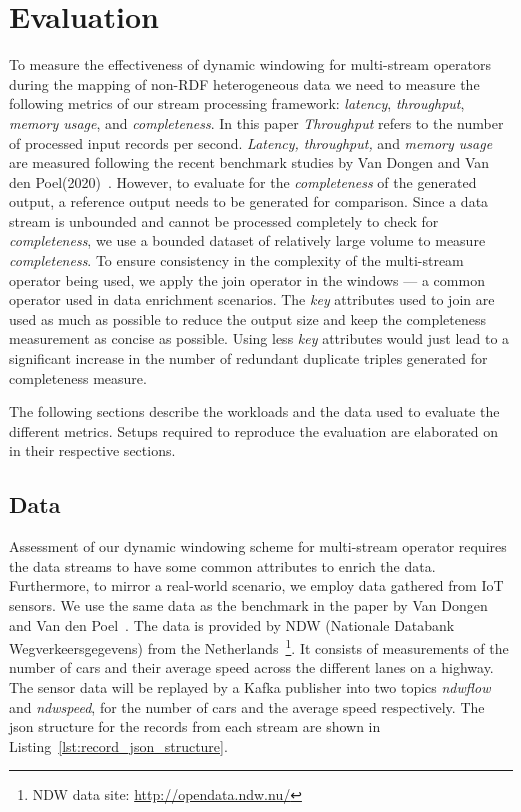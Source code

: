 \chapter{Evaluation}
\label{chap:Evaluation}

To measure the effectiveness of dynamic windowing for multi-stream operators during the 
mapping of non-RDF heterogeneous data we need to measure the following 
metrics of our stream processing framework: \emph{latency}, \emph{throughput},
\emph{memory usage}, and \emph{completeness}. In this paper \emph{Throughput} refers to the number of processed input records per second.
\emph{Latency, throughput,} and \emph{memory usage} are measured following the recent benchmark studies by 
Van Dongen and Van den Poel(2020)~\cite{evalution_of_spe}. 
However, to evaluate 
for the \emph{completeness}
of the generated output, a reference output needs 
to be generated for comparison. Since a data stream is unbounded and cannot be processed completely to check for \emph{completeness}, we use a bounded 
dataset of relatively large volume to measure \emph{completeness}.
To ensure consistency in the complexity of the multi-stream operator being used, 
we apply the join operator in the windows --- a common operator used in 
data enrichment scenarios. The \emph{key} attributes used to join are used as much as 
possible to reduce the output size and keep the completeness measurement as concise 
as possible. Using less \emph{key} attributes would just lead to a significant increase 
in the number of redundant duplicate triples generated for completeness measure. 

The following sections describe the workloads and the data used to evaluate the
different metrics. Setups required to reproduce the evaluation are elaborated on
in their respective sections. 


\section{Data}

Assessment of our dynamic windowing scheme for multi-stream operator requires 
the data streams to have some common attributes to enrich the data. Furthermore, to 
mirror a real-world scenario, we employ data gathered from IoT sensors. 
We use the same data 
as the benchmark in the paper by Van Dongen and Van den Poel~\cite{evalution_of_spe}. 
The data is provided by NDW (Nationale Databank Wegverkeersgegevens) from the 
Netherlands~\footnote{NDW data site: \href{http://opendata.ndw.nu/}{http://opendata.ndw.nu/} }.
It consists of measurements of the number of cars and their average speed across the different 
lanes on a highway. 
The sensor data will be replayed by a Kafka publisher into two topics 
\emph{ndwflow} and \emph{ndwspeed}, for the number of cars and the average speed respectively. The json 
structure for the records from each stream are shown in Listing~\ref{lst:record_json_structure}. 

